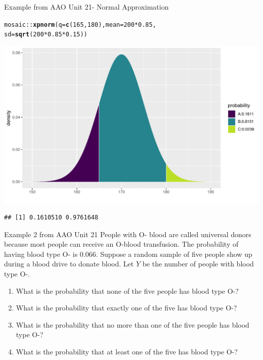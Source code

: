 \documentclass{beamer}\usepackage[]{graphicx}\usepackage[]{color}
\newcommand{\hlnum}[1]{\textcolor[rgb]{0.686,0.059,0.569}{#1}}%
\newcommand{\hlopt}[1]{\textcolor[rgb]{0,0,0}{#1}}%
\newcommand{\hlstd}[1]{\textcolor[rgb]{0.345,0.345,0.345}{#1}}%
\newcommand{\hlkwc}[1]{\textcolor[rgb]{0.333,0.667,0.333}{#1}}%
\newcommand{\hlkwd}[1]{\textcolor[rgb]{0.737,0.353,0.396}{\textbf{#1}}}%
\newenvironment{knitrout}{}{} %
\begin{document}
\begin{frame}[fragile]{Example from AAO Unit 21- Normal Approximation}

\begin{knitrout}\scriptsize
{}\color{fgcolor}
\begin{alltt}
\hlstd{mosaic}\hlopt{::}\hlkwd{xpnorm}\hlstd{(}\hlkwc{q} \hlstd{=} \hlkwd{c}\hlstd{(}\hlnum{165}\hlstd{,}\hlnum{180}\hlstd{),} \hlkwc{mean} \hlstd{=} \hlnum{200} \hlopt{*} \hlnum{0.85}\hlstd{,}
        \hlkwc{sd} \hlstd{=} \hlkwd{sqrt}\hlstd{(}\hlnum{200}\hlopt{*}\hlnum{0.85}\hlopt{*}\hlnum{0.15}\hlstd{))}
\end{alltt}


{\centering \includegraphics[width=1\linewidth]{figure/unnamed-chunk-7-1} 

}


\begin{verbatim}
## [1] 0.1610510 0.9761648
\end{verbatim}

\end{knitrout}
\end{frame}



\begin{frame}{Example 2 from AAO Unit 21}
People with O- blood are called universal donors because most people can receive an O-blood transfusion. The probability of having blood type O- is 0.066. Suppose a random sample of five people show up during a blood drive to donate blood. Let $Y$ be the number of people with blood type O-.

\begin{enumerate}
	\item What is the probability that none of the five people has blood type O-?
	\item What is the probability that exactly one of the five has blood type O-?
	\item What is the probability that no more than one of the five people has blood type O-?
	\item What is the probability that at least one of the five has blood type O-?
\end{enumerate}
\end{frame}
\end{document}
